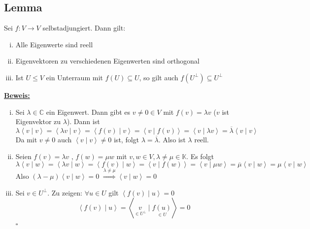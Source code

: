 \subsection{Lemma} %
\label{sub:lemma}
Sei $f : V \to V$ selbstadjungiert. Dann gilt:
\begin{enumerate}[(i)]
	\item Alle Eigenwerte sind reell
	\item Eigenvektoren zu verschiedenen Eigenwerten sind orthogonal
	\item Ist $U \le V$ ein Unterraum mit $f(U) \subseteq U$, so gilt auch $f(U^\bot) \subseteq U^\bot$
\end{enumerate}
\underline{\textbf{Beweis:}}
\begin{enumerate}[(i)]
	\item Sei $\lambda \in \mathds{C}$ ein Eigenwert. Dann gibt es $v \not= 0 \in V$ mit $f(v)= \lambda v$ ($v$ ist Eigenvektor zu $\lambda$). Dann ist 
	\[
		\lambda \left\langle v \mid v \right\rangle = \left\langle \lambda v \mid v \right\rangle = \left\langle f(v) \mid v \right\rangle = \left\langle v \mid f(v)
		\right\rangle = \left\langle v \mid \lambda v \right\rangle = \overline{\lambda} \left\langle v \mid v \right\rangle  
	\]
	Da mit $v \not= 0$ auch $\left\langle v \mid v \right\rangle \not= 0$ ist, folgt $\lambda = \overline{\lambda} $. Also ist $\lambda $ reell.
	\item Seien $f(v)=\lambda v$ , $f(w)= \mu w$ mit $v,w \in V, \lambda \not= \mu \in \mathds{K}$. Es folgt
	\[
		\lambda \left\langle v \mid w \right\rangle = \left\langle \lambda v \mid w \right\rangle = \left\langle f(v) \mid w \right\rangle = 
		\left\langle v \mid f(w) \right\rangle = \left\langle v \mid \mu w \right\rangle = \overline{\mu} \left\langle v \mid w \right\rangle  = 
		\mu \left\langle v \mid w \right\rangle 
	\]
	Also $(\lambda - \mu) \left\langle v \mid w \right\rangle = 0$ $\overset{\lambda \not= \mu}{\Longrightarrow} \left\langle v \mid w \right\rangle = 0$
	\item Sei $v \in U^\bot$. Zu zeigen: $\forall u \in U$ gilt $\left\langle f(v) \mid u \right\rangle = 0$
	\[
		\left\langle f(v) \mid u \right\rangle = \left\langle \underset{\in U^\bot}{v} \mid \underset{\in U}{f(u)} \right\rangle  = 0
	\]
	\hfill \( \square \)
\end{enumerate}


